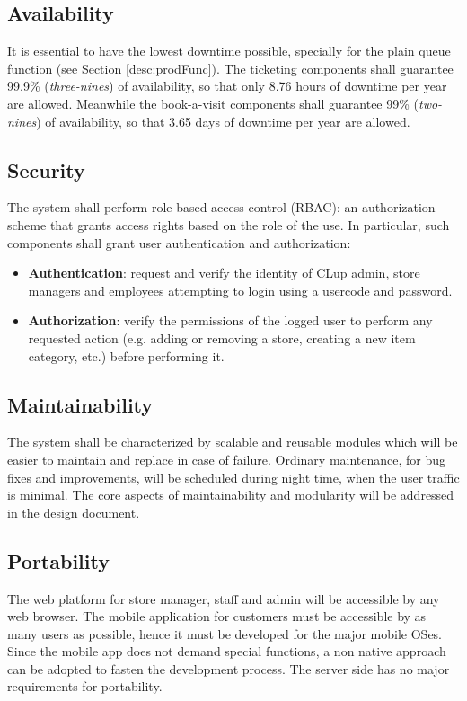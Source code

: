\subsection{Availability}
It is essential to have the lowest downtime possible, specially for the plain queue function (see Section \ref{desc:prodFunc}).
The ticketing components shall guarantee 99.9\% (\textit{three-nines}) of availability, so that only 8.76 hours of downtime per year are allowed.
Meanwhile the book-a-visit components shall guarantee 99\% (\textit{two-nines}) of availability, so that 3.65 days of downtime per year are allowed.

\subsection{Security}
The system shall perform role based access control (RBAC): an authorization scheme that grants access rights based on the role of the use. In particular, such components shall grant user authentication and authorization:
\begin{itemize}
    \item \textbf{Authentication}: request and verify the identity of CLup admin, store managers and employees attempting to login using a usercode and password.
    \item \textbf{Authorization}: verify the permissions of the logged user to perform any requested action (e.g. adding or removing a store, creating a new item category, etc.) before performing it.
\end{itemize}

\subsection{Maintainability}
The system shall be characterized by scalable and reusable modules which will be easier to maintain and replace in case of failure. Ordinary maintenance, for bug fixes and improvements, will be scheduled during night time, when the user traffic is minimal.\newline
The core aspects of maintainability and modularity will be addressed in the design document.

\subsection{Portability}
The web platform for store manager, staff and admin will be accessible by any web browser.\newline
The mobile application for customers must be accessible by as many users as possible, hence it must be developed for the major mobile OSes. Since the mobile app does not demand special functions, a non native approach can be adopted to fasten the development process.
The server side has no major requirements for portability.

